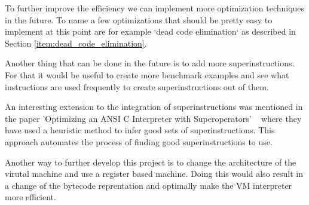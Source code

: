 \documentclass{article}
\begin{document}
To further improve the efficiency we can implement more optimization techniques
in the future. To name a few optimizations that should be pretty easy to
implement at this point are for example `dead code elimination` as described in
Section \ref{item:dead_code_elimination}.

Another thing that can be done in the future is to add more superinstructions.
For that it would be useful to create more benchmark examples and see what
instructions are used frequently to create superinstructions out of them.

An interesting extension to the integration of superinstructions was mentioned
in the paper 'Optimizing an ANSI C Interpreter with Superoperators'
~\cite{superoperators} where they have used a heuristic method to infer good
sets of superinstructions. This approach automates the process of finding good
superinstructions to use.

Another way to further develop this project is to change the architecture of the
virutal machine and use a register based machine. Doing this would also result
in a change of the bytecode reprentation and optimally make the VM interpreter
more efficient.

\clearpage


\end{document}
